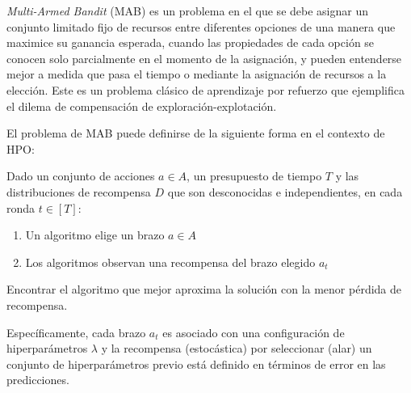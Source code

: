 \textit{Multi-Armed Bandit} (MAB) es un problema en el que se debe asignar un conjunto limitado fijo de recursos entre diferentes opciones de una manera que maximice su ganancia esperada, cuando las propiedades de cada opción se conocen solo parcialmente en el momento de la asignación, y pueden entenderse mejor a medida que pasa el tiempo o mediante la asignación de recursos a la elección. Este es un problema clásico de aprendizaje por refuerzo que ejemplifica el dilema de compensación de exploración-explotación.

El problema de MAB puede definirse de la siguiente forma en el contexto de HPO:

\begin{definition}

Dado un conjunto de acciones $a \in A$, un presupuesto de tiempo $T$ y las distribuciones de recompensa $D$ que son desconocidas e independientes, en cada ronda $t \in [T]$:

\begin{enumerate}
	\item Un algoritmo elige un brazo $a \in A$
	\item Los algoritmos observan una recompensa del brazo elegido $a_t$
\end{enumerate}

Encontrar el algoritmo que mejor aproxima la solución con la menor pérdida de recompensa.

\end{definition}

Específicamente, cada brazo $a_t$ es asociado con una configuración de hiperparámetros $\lambda$ y la recompensa (estocástica) por seleccionar (alar) un conjunto de hiperparámetros previo está definido en términos de error en las predicciones.

